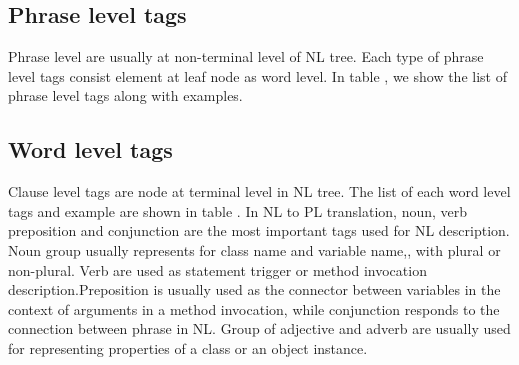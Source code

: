 \subsection{Phrase level tags}
Phrase level are usually at non-terminal level of NL tree. Each type of phrase level tags consist element at leaf node as word level. In table \cite{}, we show the list of phrase level tags along with examples.

\subsection{Word level tags}
Clause level tags are node at terminal level in NL tree. The list of each word level tags and example are shown in table \cite{}. 
In NL to PL translation, noun, verb preposition and conjunction are the most important tags used for NL description. Noun group usually represents for class name and variable name,, with plural or non-plural. Verb are used as statement trigger or method invocation description.Preposition is usually used as the connector between variables in the context of arguments in a method invocation, while conjunction responds to the connection between phrase in NL. Group of adjective and adverb are usually used for representing properties of a class or an object instance.

